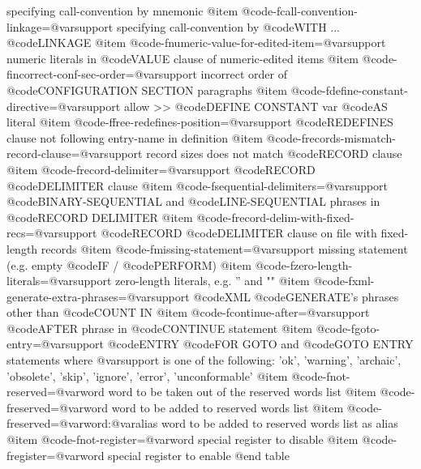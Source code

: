 specifying call-convention by mnemonic
@item @code{-fcall-convention-linkage=@var{support}}
specifying call-convention by @code{WITH} ... @code{LINKAGE}
@item @code{-fnumeric-value-for-edited-item=@var{support}}
numeric literals in @code{VALUE} clause of numeric-edited items
@item @code{-fincorrect-conf-sec-order=@var{support}}
incorrect order of @code{CONFIGURATION SECTION} paragraphs
@item @code{-fdefine-constant-directive=@var{support}}
allow >> @code{DEFINE CONSTANT} var @code{AS} literal
@item @code{-ffree-redefines-position=@var{support}}
@code{REDEFINES} clause not following entry-name in definition
@item @code{-frecords-mismatch-record-clause=@var{support}}
record sizes does not match @code{RECORD} clause
@item @code{-frecord-delimiter=@var{support}}
@code{RECORD} @code{DELIMITER} clause
@item @code{-fsequential-delimiters=@var{support}}
@code{BINARY-SEQUENTIAL} and @code{LINE-SEQUENTIAL} phrases in @code{RECORD DELIMITER}
@item @code{-frecord-delim-with-fixed-recs=@var{support}}
@code{RECORD} @code{DELIMITER} clause on file with fixed-length records
@item @code{-fmissing-statement=@var{support}}
missing statement (e.g. empty @code{IF} / @code{PERFORM})
@item @code{-fzero-length-literals=@var{support}}
zero-length literals, e.g. '' and ""
@item @code{-fxml-generate-extra-phrases=@var{support}}
@code{XML} @code{GENERATE}'s phrases other than @code{COUNT IN}
@item @code{-fcontinue-after=@var{support}}
@code{AFTER} phrase in @code{CONTINUE} statement
@item @code{-fgoto-entry=@var{support}}
@code{ENTRY} @code{FOR GOTO} and @code{GOTO ENTRY} statements
where @var{support} is one of the following:
'ok', 'warning', 'archaic', 'obsolete', 'skip', 'ignore', 'error', 'unconformable'
@item @code{-fnot-reserved=@var{word}}
word to be taken out of the reserved words list
@item @code{-freserved=@var{word}}
word to be added to reserved words list
@item @code{-freserved=@var{word}:@var{alias}}
word to be added to reserved words list as alias
@item @code{-fnot-register=@var{word}}
special register to disable
@item @code{-fregister=@var{word}}
special register to enable
@end table
